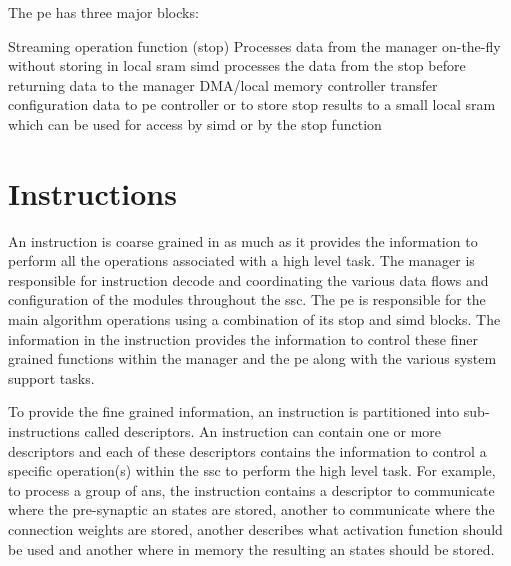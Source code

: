 The \ac{pe} has three major blocks:

\begin{outline}
    \1 Streaming operation function (\ac{stop})
      \2 Processes data from the manager on-the-fly without storing in local \ac{sram}
    \1 \ac{simd}
      \2 processes the data from the \ac{stop} before returning data to the manager
    \1 DMA/local memory controller
      \2 transfer configuration data to \ac{pe} controller or to store \ac{stop} results to a small local \ac{sram} which can be used for access by \ac{simd} or by the \ac{stop} function
\end{outline}

\fi
\section{Instructions}
\label{sec:Instructions}

An instruction is coarse grained in as much as it provides the information to perform all the operations associated with a high level task.
The manager is responsible for instruction decode and coordinating the various data flows and configuration of the modules throughout the \ac{ssc}.
The \ac{pe} is responsible for the main algorithm operations using a combination of its \ac{stop} and \ac{simd} blocks.
The information in the instruction provides the information to control these finer grained functions within the manager and the \ac{pe} along with the various system support tasks.

To provide the fine grained information, an instruction is partitioned into sub-instructions called descriptors.
An instruction can contain one or more descriptors and each of these descriptors contains the information to control a specific operation(s) within the \ac{ssc} to perform the high level task.
For example, to process a group of \acp{an}, the instruction contains a descriptor to communicate where the pre-synaptic \ac{an} states are stored, another to communicate where the connection weights are stored, another describes what activation function should be used and another where in memory the resulting \ac{an} states should be stored.

